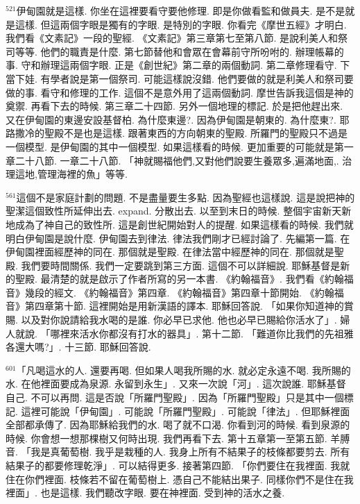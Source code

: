 \documentclass{book}
\begin{document}
$^{521}$伊甸園就是這樣.
你坐在這裡要看守要他修理.
即是你做看監和做員夫.
是不是就是這樣.
但這兩個字眼是獨有的字眼.
是特別的字眼.
你看完《摩世五經》才明白.
我們看《文素記》一段的聖經.
《文素記》第三章第七至第八節.
是說利美人和祭司等等.
他們的職責是什麼.
第七節替他和會眾在會幕前守所吩咐的.
辦理帳幕的事.
守和辦理這兩個字眼.
正是《創世紀》第二章的兩個動詞.
第二章修理看守.
下當下娃.
有學者說是第一個祭司.
可能這樣說沒錯.
他們要做的就是利美人和祭司要做的事.
看守和修理的工作.
這個不是意外用了這兩個動詞.
摩世告訴我這個是神的奠禦.
再看下去的時候.
第三章二十四節.
另外一個地理的標記.
於是把他趕出來.
又在伊甸園的東邊安設基督柏.
為什麼東邊?.
因為伊甸園是朝東的.
為什麼東?.
耶路撒冷的聖殿不是也是這樣.
跟著東西的方向朝東的聖殿.
所羅門的聖殿只不過是一個模型.
是伊甸園的其中一個模型.
如果這樣看的時候.
更加重要的可能就是第一章二十八節.
一章二十八節.
「神就賜福他們,又對他們說要生養眾多,遍滿地面,.
治理這地,管理海裡的魚」等等.

$^{561}$這個不是家庭計劃的問題.
不是盡量要生多點.
因為聖經也這樣說.
這是說把神的聖潔這個致性所延伸出去.
expand.
分散出去.
以至到末日的時候.
整個宇宙新天新地成為了神自己的致性所.
這是創世紀開始對人的提醒.
如果這樣看的時候.
我們就明白伊甸園是說什麼.
伊甸園去到律法.
律法我們剛才已經討論了.
先編第一篇.
在伊甸園裡面經歷神的同在.
那個就是聖殿.
在律法當中經歷神的同在.
那個就是聖殿.
我們要時間關係.
我們一定要跳到第三方面.
這個不可以詳細說.
耶穌基督是新的聖殿.
最清楚的就是啟示了作者所寫的另一本書.
《約翰福音》.
我們看《約翰福音》幾段的經文.
《約翰福音》第四章.
《約翰福音》第四章十節開始.
《約翰福音》第四章第十節.
這裡開始是用新漢語的譯本.
耶穌回答說.
「如果你知道神的賞賜.
以及對你說請給我水喝的是誰.
你必早已求他.
他也必早已賜給你活水了」.
婦人就說.
「哪裡來活水你都沒有打水的器具」.
第十二節.
「難道你比我們的先祖雅各還大嗎?」.
十三節.
耶穌回答說.

$^{601}$「凡喝這水的人.
還要再喝.
但如果人喝我所賜的水.
就必定永遠不喝.
我所賜的水.
在他裡面要成為泉源.
永留到永生」.
又來一次說「河」.
這次說誰.
耶穌基督自己.
不可以再問.
這是否說「所羅門聖殿」.
因為「所羅門聖殿」只是其中一個標記.
這裡可能說「伊甸園」.
可能說「所羅門聖殿」.
可能說「律法」.
但耶穌裡面全部都承傳了.
因為耶穌給我們的水.
喝了就不口渴.
你看到河的時候.
看到泉源的時候.
你會想一想那棵樹又何時出現.
我們再看下去.
第十五章第一至第五節.
羊膊音.
「我是真葡萄樹.
我乎是栽種的人.
我身上所有不結果子的枝條都要剪去.
所有結果子的都要修理乾淨」.
可以結得更多.
接著第四節.
「你們要住在我裡面.
我就住在你們裡面.
枝條若不留在葡萄樹上.
憑自己不能結出果子.
同樣你們不是住在我裡面」.
也是這樣.
我們聽改字眼.
要在神裡面.
受到神的活水之養.
\end{document}
